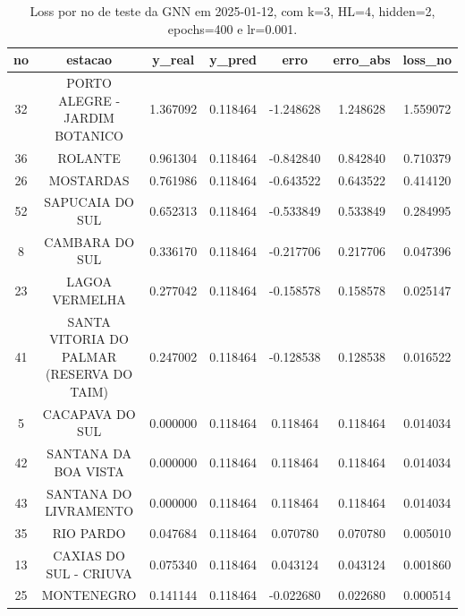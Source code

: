 \begin{table}[h]
\centering
\caption{Loss por no de teste da GNN em 2025-01-12, com k=3, HL=4, hidden=2, epochs=400 e lr=0.001.}
\label{tab:gnn_loss_k3_hl4_h2_e400_d20250112}
\begin{tabular}{ccccccc}
\toprule
no & estacao & y\_real & y\_pred & erro & erro\_abs & loss\_no \\
\midrule
32 & PORTO ALEGRE - JARDIM BOTANICO & 1.367092 & 0.118464 & -1.248628 & 1.248628 & 1.559072 \\
36 & ROLANTE & 0.961304 & 0.118464 & -0.842840 & 0.842840 & 0.710379 \\
26 & MOSTARDAS & 0.761986 & 0.118464 & -0.643522 & 0.643522 & 0.414120 \\
52 & SAPUCAIA DO SUL & 0.652313 & 0.118464 & -0.533849 & 0.533849 & 0.284995 \\
8 & CAMBARA DO SUL & 0.336170 & 0.118464 & -0.217706 & 0.217706 & 0.047396 \\
23 & LAGOA VERMELHA & 0.277042 & 0.118464 & -0.158578 & 0.158578 & 0.025147 \\
41 & SANTA VITORIA DO PALMAR (RESERVA DO TAIM) & 0.247002 & 0.118464 & -0.128538 & 0.128538 & 0.016522 \\
5 & CACAPAVA DO SUL & 0.000000 & 0.118464 & 0.118464 & 0.118464 & 0.014034 \\
42 & SANTANA DA BOA VISTA & 0.000000 & 0.118464 & 0.118464 & 0.118464 & 0.014034 \\
43 & SANTANA DO LIVRAMENTO & 0.000000 & 0.118464 & 0.118464 & 0.118464 & 0.014034 \\
35 & RIO PARDO & 0.047684 & 0.118464 & 0.070780 & 0.070780 & 0.005010 \\
13 & CAXIAS DO SUL - CRIUVA & 0.075340 & 0.118464 & 0.043124 & 0.043124 & 0.001860 \\
25 & MONTENEGRO & 0.141144 & 0.118464 & -0.022680 & 0.022680 & 0.000514 \\
\bottomrule
\end{tabular}
\end{table}
